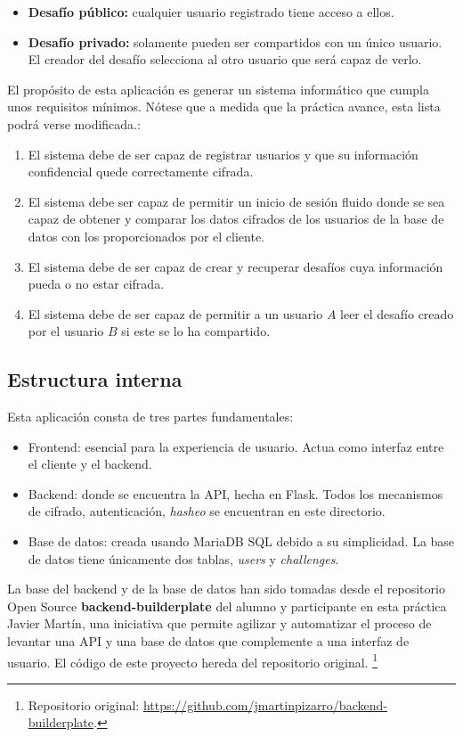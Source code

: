 \documentclass[a4paper,11pt]{report}
\begin{document}
\begin{itemize}
    \item \textbf{Desafío público:} cualquier usuario registrado tiene acceso a ellos.
    \item \textbf{Desafío privado:} solamente pueden ser compartidos con un único usuario. El creador del desafío selecciona al otro usuario que será capaz de verlo.
\end{itemize}

El propósito de esta aplicación es generar un sistema informático que cumpla unos requisitos mínimos. Nótese que a medida que la práctica avance, esta lista podrá verse modificada.:\begin{enumerate}
    \item El sistema debe de ser capaz de registrar usuarios y que su información confidencial quede correctamente cifrada.
    \item El sistema debe ser capaz de permitir un inicio de sesión fluido donde se sea capaz de obtener y comparar los datos cifrados de los usuarios de la base de datos con los proporcionados por el cliente.
    \item El sistema debe de ser capaz de crear y recuperar desafíos cuya información pueda o no estar cifrada.
    \item El sistema debe de ser capaz de permitir a un usuario $A$ leer el desafío creado por el usuario $B$ si este se lo ha compartido.
\end{enumerate}

\subsection{Estructura interna}

Esta aplicación consta de tres partes fundamentales:
\begin{itemize}
    \item Frontend: esencial para la experiencia de usuario. Actua como interfaz entre el cliente y el backend.
    \item Backend: donde se encuentra la API, hecha en Flask. Todos los mecanismos de cifrado, autenticación, \textit{hasheo} se encuentran en este directorio.
    \item Base de datos: creada usando MariaDB SQL debido a su simplicidad. La base de datos tiene únicamente dos tablas, \textit{users} y \textit{challenges}.
\end{itemize}

La base del backend y de la base de datos han sido tomadas desde el repositorio Open Source \textbf{backend-builderplate} del alumno y participante en esta práctica Javier Martín, una iniciativa que permite agilizar y automatizar el proceso de levantar una API y una base de datos que complemente a una interfaz de usuario. El código de este proyecto hereda del repositorio original.%
\footnote{Repositorio original: \url{https://github.com/jmartinpizarro/backend-builderplate}.}
\end{document}

